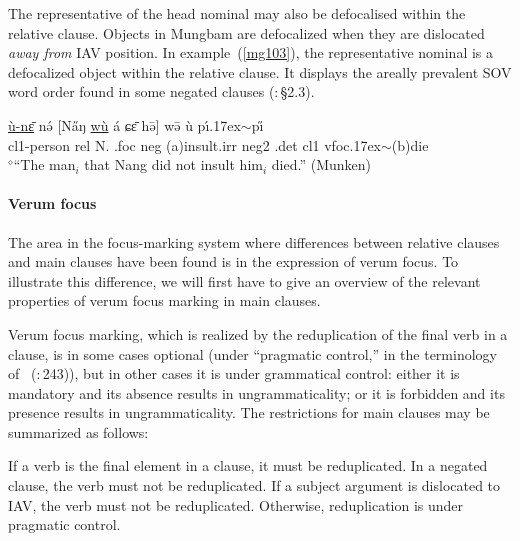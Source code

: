 \documentclass[10pt,twoside]{article}
\makeatletter
\newcommand{\cl}[1]{{\sc cl#1}}
\newcommand{\citepage}[2]{\citeauthor{#1}~{(\citeyear{#1}:\,{#2})}}
\newcommand{\citepp}[2]{(\citealp{#1}:\,{#2})}
\def\elicited{$^\diamond$}
\def\til{\raise.17ex\hbox{$\scriptstyle\mathtt{\sim}$}}	%
\renewcommand{\i}{ı}
\def\@{ə}
\def\eh{ɛ}
\def\ng{ŋ}
\def\sh{ɕ}
\makeatother
\begin{document}
The representative of the head nominal may also be defocalised within
the relative clause. Objects in Mungbam are defocalized when they
are dislocated {\it away from}\/ IAV position. 
In example~(\ref{mg103}), the representative nominal is a defocalized
object within the relative clause. It
displays the areally prevalent SOV word order found in some negated clauses
\citepp{gueldemann:2007}{\S2.3}.
%
\begin{exe}
\ex \label{mg103}
	\gll \uline{\`u-n\={\eh}} n\'{\@} $[$N\H{a}{\ng} \uline{w\`u} \'a \sh\={\eh} h\={\@}$]$ w\={\@} \`u p\'\i{\til}p\H{\i}	\\
\cl1-person {\sc rel} N. {\sc \cl1.foc} {\sc neg} ({\sc a})insult.{\sc irr} {\sc neg2} {\sc \cl1.det} \cl1 {\sc vfoc}\til{({\sc b})die}	\\
\glt \elicited``The man$_i$ that Nang did not insult him$_i$ died.'' (Munken)	%
\end{exe}
%

\paragraph{Verum focus}
The area in the focus-marking system where differences
between relative clauses and main clauses have been found
is in the expression of verum focus. To illustrate this
difference, we will first have to give an overview of the relevant
properties of verum focus marking in main clauses.

Verum focus marking, which is realized by the reduplication of the
final verb in a clause, is in some cases optional (under
``pragmatic control,'' in the terminology of \citepage{hyman:1984}{243}),
but in other cases it is under grammatical control: either it is mandatory 
and its absence results in ungrammaticality; or it is forbidden
and its presence results in ungrammaticality.
The restrictions for main clauses may be summarized as follows: 
%
\begin{exe}
\ex \label{mg1044}
\begin{xlist}
\ex \label{mg1044a}
If a verb is the final element in a clause, it must be reduplicated.
\ex 
In a negated clause, the verb must not be reduplicated.
\ex \label{mg1044b}
If a subject argument is dislocated to IAV, the verb must not be reduplicated.
\ex Otherwise, reduplication is under pragmatic control.
\end{xlist}
\end{exe}
%
\end{document}
